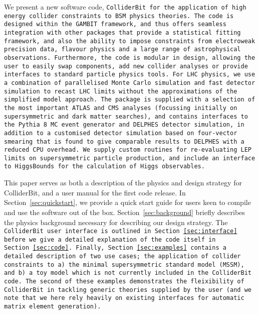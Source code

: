 We present a new software code, \tt ColliderBit \rm for the application of high energy collider constraints to BSM physics theories. The code is designed within the \tt GAMBIT \rm framework, and thus offers seamless integration with other packages that provide a statistical fitting framework, and also the ability to impose constraints from electroweak precision data, flavour physics and a large range of astrophysical observations. Furthermore, the code is modular in design, allowing the user to easily swap components, add new collider analyses or provide interfaces to standard particle physics tools. For LHC physics, we use a combination of parallelised Monte Carlo simulation and fast detector simulation to recast LHC limits without the approximations of the simplified model approach. The package is supplied with a selection of the most important ATLAS and CMS analyses (focussing initially on supersymmetric and dark matter searches), and contains interfaces to the \tt Pythia 8 \rm MC event generator and \tt DELPHES \rm detector simulation, in addition to a customised detector simulation based on four-vector smearing that is found to give comparable results to \tt DELPHES \rm with a reduced CPU overhead. We supply custom routines for re-evaluating LEP limits on supersymmetric particle production, and include an interface to \tt HiggsBounds \rm for the calculation of Higgs observables.

This paper serves as both a description of the physics and design strategy for ColliderBit, and a user manual for the first code release. In Section~\ref{sec:quickstart}, we provide a quick start guide for users keen to compile and use the software out of the box. Section~\ref{sec:background} briefly describes the physics background necessary for describing our design strategy. The \tt ColliderBit \rm user interface is outlined in Section~\ref{sec:interface} before we give a detailed explanation of the code itself in Section~\ref{sec:code}. Finally, Section~\ref{sec:examples} contains a detailed description of two use cases; the application of collider constraints to a) the minimal supersymmetric standard model (MSSM), and b) a toy model which is not currently included in the \tt ColliderBit code\rm. The second of these examples demonstrates the fleixibility of \tt ColliderBit \rm in tackling generic theories supplied by the user (and we note that we here rely heavily on existing interfaces for automatic matrix element generation).

